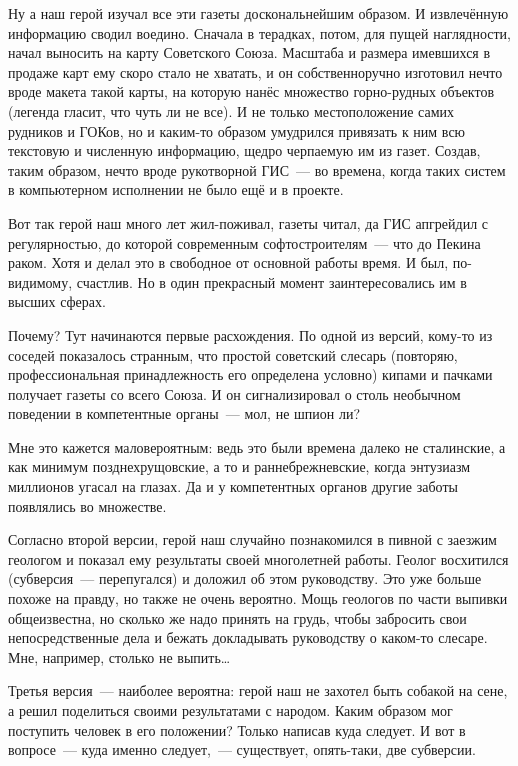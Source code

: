 Ну а наш герой изучал все эти газеты доскональнейшим образом. И извлечённую информацию сводил воедино. Сначала в терадках, потом, для пущей наглядности, начал выносить на карту Советского Союза. Масштаба и размера имевшихся в продаже карт ему скоро стало не хватать, и он собственноручно изготовил нечто вроде макета такой карты, на которую нанёс множество горно-рудных объектов (легенда гласит, что чуть ли не все). И не только местоположение самих рудников и ГОКов, но и каким-то образом умудрился привязать к ним всю текстовую и численную информацию, щедро черпаемую им из газет. Создав, таким образом, нечто вроде рукотворной ГИС~--- во времена, когда таких систем в компьютерном исполнении не было ещё и в проекте.

Вот так герой наш много лет жил-поживал, газеты читал, да ГИС апгрейдил с регулярностью, до которой современным софтостроителям~--- что до Пекина раком. Хотя и делал это в свободное от основной работы время. И был, по-видимому, счастлив. Но в один прекрасный момент заинтересовались им в высших сферах.

Почему? Тут начинаются первые расхождения. По одной из версий, кому-то из соседей показалось странным, что простой советский слесарь (повторяю, профессиональная принадлежность его определена условно) кипами и пачками получает газеты со всего Союза. И он сигнализировал о столь необычном поведении в компетентные органы~--- мол, не шпион ли?

Мне это кажется маловероятным: ведь это были времена далеко не сталинские, а как минимум позднехрущовские, а то и раннебрежневские, когда энтузиазм миллионов угасал на глазах. Да и у компетентных органов другие заботы появлялись во множестве.

Согласно второй версии, герой наш случайно познакомился в пивной с заезжим геологом и показал ему результаты своей многолетней работы. Геолог восхитился (субверсия~--- перепугался) и доложил об этом руководству. Это уже больше похоже на правду, но также не очень вероятно. Мощь геологов по части выпивки общеизвестна, но сколько же надо принять на грудь, чтобы забросить свои непосредственные дела и бежать докладывать руководству о каком-то слесаре. Мне, например, столько не выпить\dots

Третья версия~--- наиболее вероятна: герой наш не захотел быть собакой на сене, а решил поделиться своими результатами с народом. Каким образом мог поступить человек в его положении? Только написав куда следует. И вот в вопросе~--- куда именно следует,~--- существует, опять-таки, две субверсии.

